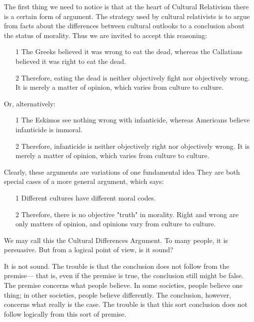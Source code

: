The first thing we need to notice is that at the heart of Cultural Relativism 
there  is  a  certain  form  of  argument.  The  strategy  used  by  cultural 
relativists  is  to  argue  from  facts  about  the  differences  between  cultural 
outlooks to a conclusion about the status of morality. Thus we are invited 
to accept this reasoning: 
\begin{enumerate}
\item[1] The Greeks believed it was wrong to eat the dead, 
whereas  the  Callatians  believed  it  was  right  to  eat  the 
dead. 
\item[2] Therefore,  eating  the  dead  is  neither  objectively  fight  nor 
objectively  wrong.  It  is  merely  a  matter  of  opinion,  which 
varies from culture to culture. 
\end{enumerate}
Or, alternatively:
\begin{enumerate} 
\item[1] The  Eskimos  see  nothing  wrong  with  infanticide,  whereas 
Americans believe infanticide is immoral. 
\item[2] Therefore, infanticide is neither objectively right nor 
objectively  wrong.  It  is  merely  a  matter  of  opinion,  which 
varies from culture to culture. 
\end{enumerate}
Clearly,  these  arguments  are  variations  of  one  fundamental  idea  They 
are both special cases of a more general argument, which says: 
\begin{enumerate}
\item[1] Different cultures have different moral codes. 
\item[2] Therefore,  there  is  no  objective  "truth"  in  morality.  Right 
and  wrong  are  only  matters  of  opinion,  and  opinions  vary 
from culture to culture. 
\end{enumerate}
We may call this  the Cultural Differences  Argument. To many people, it 
is persuasive. But from a logical point of view, is it sound?

It  is  not  sound.  The  trouble  is  that  the  conclusion  does  not  follow  from 
the  premise— that  is,  even  if  the  premise  is  true,  the  conclusion  still 
might  be  false.  The  premise  concerns  what  people  believe.  In  some 
societies,  people  believe  one  thing;  in  other  societies,  people  believe 
differently.  The  conclusion,  however,  concerns  what  really  is  the  case. 
The trouble is that this sort conclusion does not follow logically from this 
sort of premise. 


